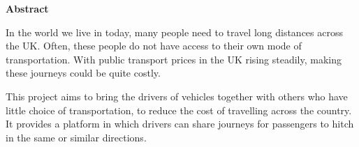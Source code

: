 \thispagestyle{empty}

\begin{center}
    {\LARGE\bf Abstract}
\end{center}

In the world we live in today, many people need to travel long distances across the UK. Often, these people do not have access to their own mode of transportation. With public transport prices in the UK rising steadily, making these journeys could be quite costly. 

This project aims to bring the drivers of vehicles together with others who have little choice of transportation, to reduce the cost of travelling across the country. It provides a platform in which drivers can share journeys for passengers to hitch in the same or similar directions.
